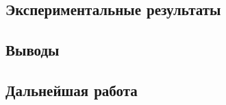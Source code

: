 \subsection{Экспериментальные результаты}
\par

\subsection{Выводы}
\par

\subsection{Дальнейшая работа}
\par
